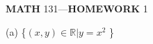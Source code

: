 \documentclass{article}
\begin{document}
\begin{center}
  \textbf{MATH} 131---\textbf{HOMEWORK} 1
\end{center}
(a) \{$(x,y)\in \mathbb{R}| y = x^2$ \}
\end{document}
